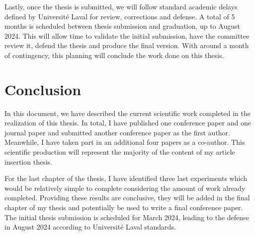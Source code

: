 \documentclass[12pt,letterpaper,oneside]{article}
\begin{document}
Lastly, once the thesis is submitted, we will follow standard academic delays defined by Université Laval for review, corrections and defense.
A total of 5 months is scheduled between thesis submission and graduation, up to August 2024. %
This will allow time to validate the initial submission, have the committee review it, defend the thesis and produce the final version.
With around a month of contingency, this planning will conclude the work done on this thesis.

\section{Conclusion}
\label{sec:conclusion}

In this document, we have described the current scientific work completed in the realization of this thesis.
In total, I have published one conference paper and one journal paper and submitted another conference paper as the first author.
Meanwhile, I have taken part in an additional four papers as a co-author.
This scientific production will represent the majority of the content of my article insertion thesis.

For the last chapter of the thesis, I have identified three last experiments which would be relatively simple to complete considering the amount of work already completed.
Providing these results are conclusive, they will be added in the final chapter of my thesis and potentially be used to write a final conference paper.
The initial thesis submission is scheduled for March 2024, leading to the defense in August 2024 according to Université Laval standards.


\printbibliography

%
\end{document}
